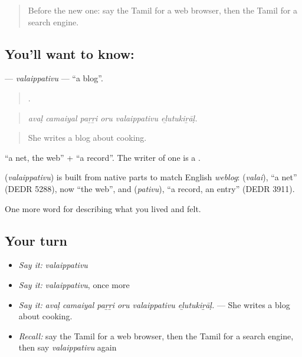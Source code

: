 \begin{quote}
Before the new one: say the Tamil for a web browser, then the Tamil for a search engine.
\end{quote}

\subsection*{You'll want to know: }
\textbf{} — \emph{valaippativu} — \textquotedblleft{}a blog\textquotedblright{}.

\begin{quote}
     .
\end{quote}

\begin{quote}
\emph{avaḷ camaiyal paṟṟi oru valaippativu eḻutukiṟāḷ.}
\end{quote}

\begin{quote}
She writes a blog about cooking.
\end{quote}

 \textquotedblleft{}a net, the web\textquotedblright{} +  \textquotedblleft{}a record\textquotedblright{}. The writer of one is a .

\begin{cousinweb}
\textbf{} (\emph{valaippativu}) is built from native parts to match English \emph{weblog}:  (\emph{valai}), \textquotedblleft{}a net\textquotedblright{} (DEDR 5288), now \textquotedblleft{}the web\textquotedblright{}, and  (\emph{pativu}), \textquotedblleft{}a record, an entry\textquotedblright{} (DEDR 3911).
\end{cousinweb}

\begin{grammarlens}[title={What you've built}]
One more word for describing what you lived and felt.
\end{grammarlens}

\subsection*{Your turn}
\begin{itemize}
\raggedright
  \item \emph{Say it:} \emph{valaippativu}
  \item \emph{Say it:} \emph{valaippativu}, once more
  \item \emph{Say it:} \emph{avaḷ camaiyal paṟṟi oru valaippativu eḻutukiṟāḷ.} — She writes a blog about cooking.
  \item \emph{Recall:} say the Tamil for a web browser, then the Tamil for a search engine, then say \emph{valaippativu} again
\end{itemize}

